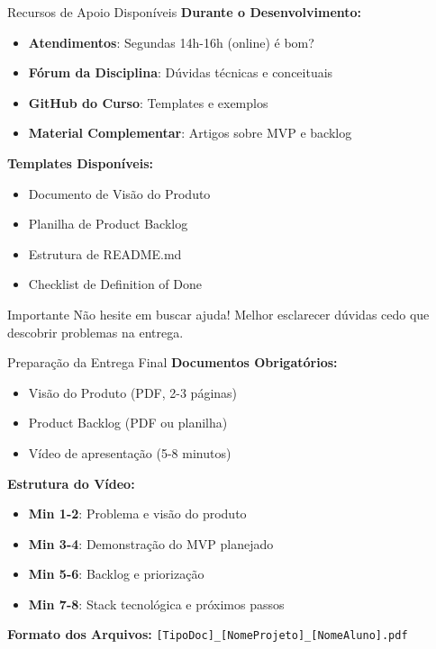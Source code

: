\documentclass[10pt]{beamer}
\begin{document}
\begin{frame}{Recursos de Apoio Disponíveis}
\textbf{Durante o Desenvolvimento:}
\begin{itemize}
    \item \textbf{Atendimentos}: Segundas 14h-16h (online) é bom?
    \item \textbf{Fórum da Disciplina}: Dúvidas técnicas e conceituais
    \item \textbf{GitHub do Curso}: Templates e exemplos
    \item \textbf{Material Complementar}: Artigos sobre MVP e backlog
\end{itemize}

\vspace{0.3cm}
\textbf{Templates Disponíveis:}
\begin{itemize}
    \item Documento de Visão do Produto
    \item Planilha de Product Backlog
    \item Estrutura de README.md
    \item Checklist de Definition of Done
\end{itemize}

\vspace{0.3cm}
\begin{alertblock}{Importante}
Não hesite em buscar ajuda! Melhor esclarecer dúvidas cedo que descobrir problemas na entrega.
\end{alertblock}
\end{frame}

\begin{frame}{Preparação da Entrega Final}
\textbf{Documentos Obrigatórios:}
\begin{itemize}
    \item Visão do Produto (PDF, 2-3 páginas)
    \item Product Backlog (PDF ou planilha)
    \item Vídeo de apresentação (5-8 minutos)
\end{itemize}

\vspace{0.3cm}
\textbf{Estrutura do Vídeo:}
\begin{itemize}
    \item \textbf{Min 1-2}: Problema e visão do produto
    \item \textbf{Min 3-4}: Demonstração do MVP planejado
    \item \textbf{Min 5-6}: Backlog e priorização
    \item \textbf{Min 7-8}: Stack tecnológica e próximos passos
\end{itemize}

\vspace{0.3cm}
\textbf{Formato dos Arquivos:}
\texttt{[TipoDoc]\_[NomeProjeto]\_[NomeAluno].pdf}
\end{frame}
\end{document}
